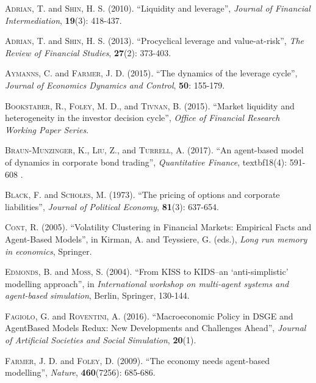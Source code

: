 \documentclass[11pt]{article}
\begin{document}
\begin{thebibliography}{100}{}
	 \textsc{Adrian, T.} and \textsc{Shin, H. S.} (2010). ``Liquidity and leverage'', \emph{Journal of Financial Intermediation}, \textbf{19}(3): 418-437.

	 \textsc{Adrian, T.} and \textsc{Shin, H. S.} (2013). ``Procyclical leverage and value-at-risk'', \emph{The Review of Financial Studies}, \textbf{27}(2): 373-403.

	 \textsc{Aymanns, C.} and \textsc{Farmer, J. D.} (2015). ``The dynamics of the leverage cycle'', \emph{Journal of Economics Dynamics and Control}, \textbf{50}: 155-179.
	
	 \textsc{Bookstaber, R.}, \textsc{Foley, M. D.}, and \textsc{Tivnan, B.} (2015). ``Market liquidity and heterogeneity in the investor decision cycle'', \emph{Office of Financial Research Working Paper Series}. 
	
	 \textsc{Braun-Munzinger, K.}, \textsc{Liu, Z.}, and \textsc{Turrell, A.} (2017). ``An agent-based model of dynamics in corporate bond trading'', \emph{Quantitative Finance}, textbf{18}(4): 591-608 .

	 \textsc{Black, F.} and \textsc{Scholes, M.} (1973). ``The pricing of options and corporate liabilities'', \emph{Journal of Political Economy}, \textbf{81}(3): 637-654.

	 \textsc{Cont, R.} (2005). ``Volatility Clustering in Financial Markets: Empirical Facts and Agent-Based Models'', in Kirman, A. and Teyssiere, G. (eds.), \emph{Long run memory in economics}, Springer.

	 \textsc{Edmonds, B.} and \textsc{Moss, S.} (2004). ``From KISS to KIDS–an ‘anti-simplistic' modelling approach'', in \emph{International workshop on multi-agent systems and agent-based simulation}, Berlin, Springer, 130-144.

	 \textsc{Fagiolo, G.} and \textsc{Roventini, A.} (2016). ``Macroeconomic Policy in DSGE and AgentBased Models Redux: New Developments and Challenges Ahead'', \emph{Journal of Artificial Societies and Social Simulation}, \textbf{20}(1).

	 \textsc{Farmer, J. D.} and \textsc{Foley, D.} (2009). ``The economy needs agent-based modelling'', \emph{Nature}, \textbf{460}(7256): 685-686.
	

\end{thebibliography}
\end{document}
